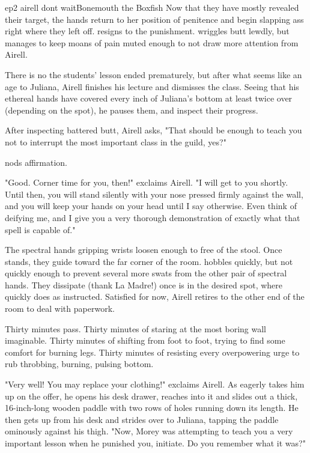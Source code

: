 \documentclass{book}
\begin{document}
\begin{childnode}{ep2 airell dont wait}{Bonemouth the Boxfish}
Now that they have mostly revealed their target, the hands return \name{} to her position of penitence and begin slapping \hisher{} ass right where they left off. \name{} resigns \himselfherself{} 
to the punishment. \HeShe{} wriggles \hisher{} butt lewdly, but manages to keep \hisher{} moans of pain muted enough to not draw more attention from Airell. 

There is no the students' lesson ended prematurely, but after what seems like an age to Juliana, Airell finishes his lecture and dismisses the class. Seeing that his ethereal hands have covered 
every inch of Juliana's bottom at least twice over (depending on the spot), he pauses them, and  inspect 
their progress. 

After inspecting \hisher{} battered butt, Airell asks, "That should be enough to teach you not to interrupt the most important class in the guild, yes?" 

\name{} nods \hisher{} affirmation. 

"Good. Corner time for you, then!" exclaims Airell. "I will get to you shortly. Until then, you will stand silently with your nose pressed firmly against the wall, and you will keep your hands on 
your head until I say otherwise. Even think of deifying me, and I give you a very thorough demonstration of exactly what that spell is capable of."

The spectral hands gripping \names{} wrists loosen enough to free \himher{} of the stool. Once \name{} stands, they guide \himher{} toward the far corner of the room. \name{} hobbles quickly, but 
not quickly enough to prevent several more swats from the other pair of spectral hands. They dissipate (thank La Madre!) once \name{} is in the desired spot, where \heshe{} quickly does as 
instructed. Satisfied for now, Airell retires to the other end of the room to deal with paperwork.

Thirty minutes pass. Thirty minutes of staring at the most boring wall imaginable. Thirty minutes of shifting from foot to foot, trying to find some comfort for \hisher{} burning legs. Thirty
minutes of resisting every overpowering urge to rub \hisher{} throbbing, burning, pulsing bottom. 

"Very well! You may replace your clothing!" exclaims Airell. As \name{} eagerly takes him up on the offer, he opens his desk drawer, reaches into it and slides out a thick, 16-inch-long wooden 
paddle with two rows of holes running down its length. He then gets up from his desk and strides over to Juliana, tapping the paddle ominously against his thigh. "Now, Morey was attempting to teach 
you a very important lesson when he punished you, initiate. Do you remember what it was?"


\end{childnode}
\end{document}
